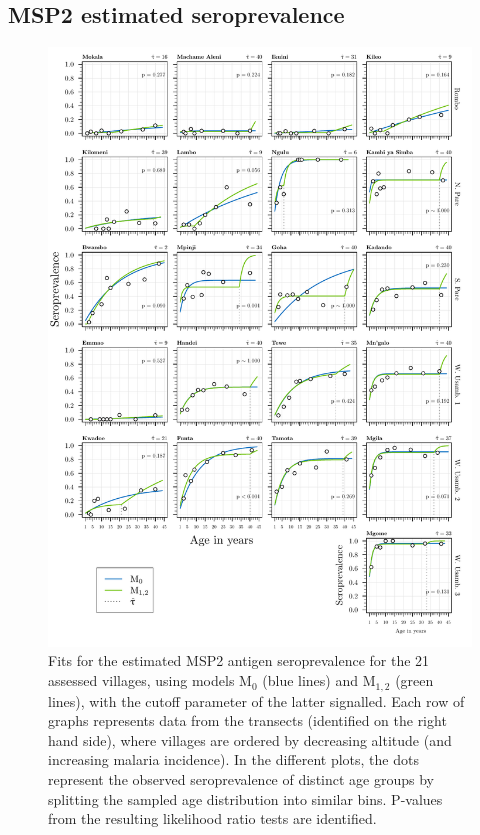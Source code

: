 \begin{appendices}
\subsection{MSP2 estimated seroprevalence} \label{appendix:M2.seroprev.msp2}

\begin{figure}[H]
\center
\begin{adjustbox}{width=\linewidth,totalheight=\baselineskip}
\includegraphics[width=\columnwidth]{images/Seroprevalence_M0vM12_msp2.pdf}
\end{adjustbox}
\caption[Estimated MSP2 seroprevalence for models M$_0$ and M$_{1,2}$]{Fits for the estimated MSP2 antigen seroprevalence for the 21 assessed villages, using models M$_0$ (blue lines) and M$_{1,2}$ (green lines), with the cutoff parameter of the latter signalled. Each row of graphs represents data from the transects (identified on the right hand side), where villages are ordered by decreasing altitude (and increasing malaria incidence). In the different plots, the dots represent the observed seroprevalence of distinct age groups by splitting the sampled age distribution into similar bins. P-values from the resulting likelihood ratio tests are identified.}
\label{fig:msp2.seroprevalence.M0.M12}
\end{figure}



\end{appendices}
